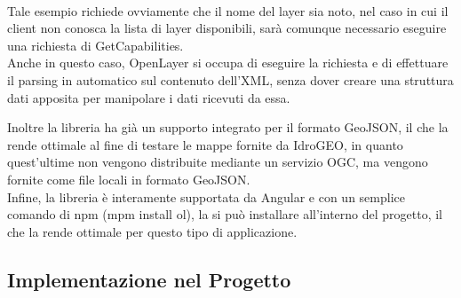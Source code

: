 \\Tale esempio richiede ovviamente che il nome del layer sia noto, nel caso in cui il client non conosca la lista di layer disponibili, sarà comunque necessario eseguire una richiesta di GetCapabilities.
\\Anche in questo caso, OpenLayer si occupa di eseguire la richiesta e di effettuare il parsing in automatico sul contenuto dell'XML, senza dover creare una struttura dati apposita per manipolare i dati ricevuti da essa.

Inoltre la libreria ha già un supporto integrato per il formato GeoJSON, il che la rende ottimale al fine di testare le mappe fornite da IdroGEO, in quanto quest'ultime non vengono distribuite mediante un servizio OGC, ma vengono fornite come file locali in formato GeoJSON.
\\Infine, la libreria è interamente supportata da Angular e con un semplice comando di npm (mpm install ol), la si può installare all'interno del progetto, il che la rende ottimale per questo tipo di applicazione.


\subsection{Implementazione nel Progetto}


